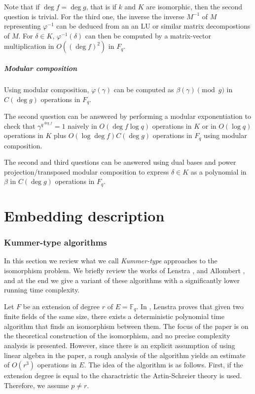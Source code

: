 \documentclass[12pt]{article}
\theoremstyle{plain}
\theoremstyle{definition}
\def\F{\ensuremath{\mathbb{F}}}
\newcounter{algorithm}
\begin{document}
Note that if $\deg f = \deg g$, that is if $k$ and $K$ are
isomorphic, then the second question is trivial.
For the third one, the inverse 
the inverse $M^{-1}$ of $M$ representing $\varphi^{-1}$
can be deduced from an an LU or similar matrix decompostions of $M$.
For $\delta \in K$, $\varphi^{-1}(\delta)$ can then be computed by a
matrix-vector multiplication in $O((\deg f)^2)$ in $F_q$.

\subsubsection{Modular composition}

Using modular composition, $\varphi(\gamma)$ can be computed
as $\beta(\gamma) \pmod{g}$ in $C(\deg g)$ operations in $F_q$.

The second question can be answered by performing a modular
exponentiation to check that $\gamma^{q^{\deg f}} = 1$
naively in $O(\deg f \log q)$ operations in $K$
or in $O(\log q)$ operations in $K$ plus
$O(\log \deg f) C(\deg g)$ operations in $F_q$ using modular composition.

The second and third questions can be answered using
dual bases and power projection/transposed modular composition
to express $\delta \in K$ as a polynomial in $\beta$ in
$C(\deg g)$ operations in $F_q$.


\part{Embedding description}


\section{Kummer-type algorithms}

In this section we review what we call \textit{Kummer-type} approaches to the isomorphism problem. 
We briefly review the works of Lenstra \cite{LenstraJr91}, and Allombert \cite{Allombert02}, and at 
the end we give a variant of these algorithms with a significantly lower running time complexity.

Let $F$ be an extension of degree $r$ of $E = \F_q$. In \cite{LenstraJr91}, Lenstra proves that 
given two finite fields of the same size, there exists a deterministic polynomial time algorithm 
that finds an isomorphism between them. The focus of the paper is on the theoretical construction 
of the isomorphism, and no precise complexity analysis is presented. However, since there is an 
explicit assumption of using linear algebra in the paper, a rough analysis of the algorithm yields 
an estimate of $O(r^3)$ operations in $E$. The idea of the algorithm is as follows. First, if 
the extension degree is equal to the charactristic the Artin-Schreier theory is used. Therefore, we 
assume $p \ne r$.
\end{document}

